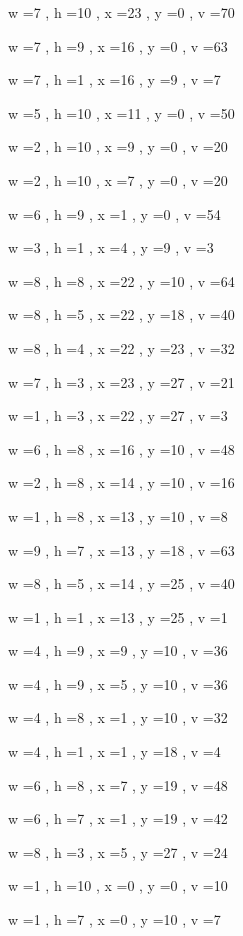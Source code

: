 \documentclass[11pt]{article}
\begin{document}


w =7 , h =10 , x =23 , y =0 , v =70
\par
w =7 , h =9 , x =16 , y =0 , v =63
\par
w =7 , h =1 , x =16 , y =9 , v =7
\par
w =5 , h =10 , x =11 , y =0 , v =50
\par
w =2 , h =10 , x =9 , y =0 , v =20
\par
w =2 , h =10 , x =7 , y =0 , v =20
\par
w =6 , h =9 , x =1 , y =0 , v =54
\par
w =3 , h =1 , x =4 , y =9 , v =3
\par
w =8 , h =8 , x =22 , y =10 , v =64
\par
w =8 , h =5 , x =22 , y =18 , v =40
\par
w =8 , h =4 , x =22 , y =23 , v =32
\par
w =7 , h =3 , x =23 , y =27 , v =21
\par
w =1 , h =3 , x =22 , y =27 , v =3
\par
w =6 , h =8 , x =16 , y =10 , v =48
\par
w =2 , h =8 , x =14 , y =10 , v =16
\par
w =1 , h =8 , x =13 , y =10 , v =8
\par
w =9 , h =7 , x =13 , y =18 , v =63
\par
w =8 , h =5 , x =14 , y =25 , v =40
\par
w =1 , h =1 , x =13 , y =25 , v =1
\par
w =4 , h =9 , x =9 , y =10 , v =36
\par
w =4 , h =9 , x =5 , y =10 , v =36
\par
w =4 , h =8 , x =1 , y =10 , v =32
\par
w =4 , h =1 , x =1 , y =18 , v =4
\par
w =6 , h =8 , x =7 , y =19 , v =48
\par
w =6 , h =7 , x =1 , y =19 , v =42
\par
w =8 , h =3 , x =5 , y =27 , v =24
\par
w =1 , h =10 , x =0 , y =0 , v =10
\par
w =1 , h =7 , x =0 , y =10 , v =7
\par
\newpage
\end{document}
